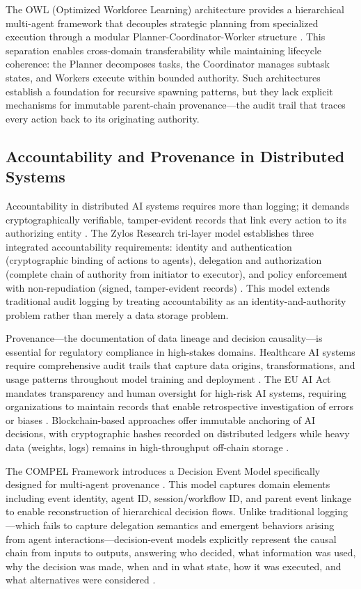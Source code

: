 The OWL (Optimized Workforce Learning) architecture provides a hierarchical multi-agent framework that decouples strategic planning from specialized execution through a modular Planner-Coordinator-Worker structure \cite{owl_neurips2025}. This separation enables cross-domain transferability while maintaining lifecycle coherence: the Planner decomposes tasks, the Coordinator manages subtask states, and Workers execute within bounded authority. Such architectures establish a foundation for recursive spawning patterns, but they lack explicit mechanisms for immutable parent-chain provenance—the audit trail that traces every action back to its originating authority.

\subsection{Accountability and Provenance in Distributed Systems}

Accountability in distributed AI systems requires more than logging; it demands cryptographically verifiable, tamper-evident records that link every action to its authorizing entity \cite{zylos_accountability2026}. The Zylos Research tri-layer model establishes three integrated accountability requirements: identity and authentication (cryptographic binding of actions to agents), delegation and authorization (complete chain of authority from initiator to executor), and policy enforcement with non-repudiation (signed, tamper-evident records) \cite{zylos_accountability2026}. This model extends traditional audit logging by treating accountability as an identity-and-authority problem rather than merely a data storage problem.

Provenance—the documentation of data lineage and decision causality—is essential for regulatory compliance in high-stakes domains. Healthcare AI systems require comprehensive audit trails that capture data origins, transformations, and usage patterns throughout model training and deployment \cite{healthcare_ai_provenance}. The EU AI Act mandates transparency and human oversight for high-risk AI systems, requiring organizations to maintain records that enable retrospective investigation of errors or biases \cite{audit_trails_arxiv2601}. Blockchain-based approaches offer immutable anchoring of AI decisions, with cryptographic hashes recorded on distributed ledgers while heavy data (weights, logs) remains in high-throughput off-chain storage \cite{ledger_cphai}.

The COMPEL Framework introduces a Decision Event Model specifically designed for multi-agent provenance \cite{compel_framework}. This model captures domain elements including event identity, agent ID, session/workflow ID, and parent event linkage to enable reconstruction of hierarchical decision flows. Unlike traditional logging—which fails to capture delegation semantics and emergent behaviors arising from agent interactions—decision-event models explicitly represent the causal chain from inputs to outputs, answering who decided, what information was used, why the decision was made, when and in what state, how it was executed, and what alternatives were considered \cite{compel_framework}.

